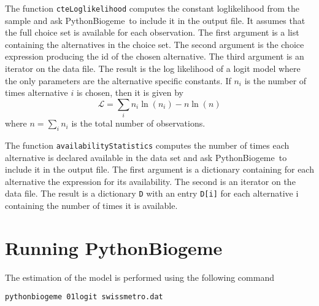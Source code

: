 \documentclass[12pt,a4paper]{article}
\newcommand{\PBIOGEME}{PythonBiogeme}
\begin{document}
The function \lstinline+cteLoglikelihood+ computes the constant loglikelihood from the sample and ask \PBIOGEME\ to include it in the output file. It assumes that the full choice set is available for each observation.
The first argument is a list containing the alternatives in the choice set.
The second argument is the choice expression producing the id of the
chosen alternative. The third argument is an iterator on the data file.
The result is the log likelihood of a logit model where the only
parameters are the alternative specific constants. If $n_i$ is the
number of times alternative $i$ is chosen, then it is given by 
\begin{equation}
 \mathcal{L} = \sum_i n_i \ln(n_i) - n \ln(n) 
\end{equation}
where $n = \sum_i n_i$ is the total number of observations.

The function \lstinline+availabilityStatistics+ computes the number of
times each alternative is declared available in the data set and ask
\PBIOGEME\ to include it in the output file.
The first argument is a dictionary containing for each alternative the
expression for its availability. The second is  an iterator on the
data file. The result is a dictionary \lstinline+D+ with an entry \lstinline+D[i]+ for each
alternative i containing the number of times it is available.

\section{Running \PBIOGEME}

The estimation of the model is performed using the following command 
\begin{lstlisting}
pythonbiogeme 01logit swissmetro.dat
\end{lstlisting}
\end{document}
